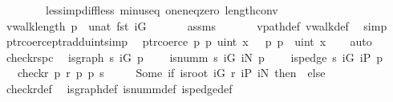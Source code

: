 \begin{isabellebody}
\ \ \ \ \ \ \ \ less{\isacharunderscore}imp{\isacharunderscore}diff{\isacharunderscore}less\ minus{\isacharunderscore}eq\ one{\isacharunderscore}neq{\isacharunderscore}zero\ length{\isacharunderscore}{}{\isacharunderscore}conv{\isacharparenright}\isanewline
\ \ \isamarkupfalse%
\ {\isachardoublequoteopen}vwalk{\isacharunderscore}length\ p\ {\isacharless}\ unat\ {\isacharparenleft}fst\ iG{\isacharparenright}{\isachardoublequoteclose}\isanewline
\ \ \ \ \isamarkupfalse%
\ \ assms\ \isanewline
\ \ \ \ \isamarkupfalse%
\ vpath{\isacharunderscore}def\ vwalk{\isacharunderscore}def\ \isamarkupfalse%
\ simp\isanewline
{}\isamarkupfalse%
%
\endisatagproof
{\isafoldproof}%
%
\isadelimproof
\isanewline
%
\endisadelimproof
\isanewline
{}\isamarkupfalse%
\ ptr{\isacharunderscore}coerce{\isacharunderscore}ptr{\isacharunderscore}add{\isacharunderscore}uint{\isacharbrackleft}simp{\isacharbrackright}{\isacharcolon}\isanewline
\ \ {\isachardoublequoteopen}ptr{\isacharunderscore}coerce\ {\isacharparenleft}p\ {\isacharplus}\isactrlsub p\ uint\ x{\isacharparenright}\ {\isacharequal}\ \ p\ {\isacharplus}\isactrlsub p\ \ {\isacharparenleft}uint\ x{\isacharparenright}{\isachardoublequoteclose}\isanewline
%
\isadelimproof
\ \ %
\endisadelimproof
%
\isatagproof
{}\isamarkupfalse%
\ auto%
\endisatagproof
{\isafoldproof}%
%
\isadelimproof
\isanewline
%
\endisadelimproof
\isanewline
{}\isamarkupfalse%
\ check{\isacharunderscore}r{\isacharprime}{\isacharunderscore}spc{\isacharcolon}\isanewline
\ \ {\isachardoublequoteopen}is{\isacharunderscore}graph\ s\ iG\ p\ {\isasymLongrightarrow}\isanewline
\ \ \ is{\isacharunderscore}numm\ s\ iG\ iN\ p{\isacharprime}\ {\isasymLongrightarrow}\isanewline
\ \ \ is{\isacharunderscore}pedge\ s\ iG\ iP\ p{\isacharprime}{\isacharprime}\ {\isasymLongrightarrow}\isanewline
\ \ \ check{\isacharunderscore}r{\isacharprime}\ p\ r\ p{\isacharprime}{\isacharprime}\ p{\isacharprime}\ s\ {\isacharequal}\ \isanewline
\ \ \ Some\ {\isacharparenleft}if\ is{\isacharunderscore}root\ iG\ r\ iP\ iN\ then\ {}\ else\ {}{\isacharparenright}{\isachardoublequoteclose}\isanewline
%
\isadelimproof
\ \ %
\endisadelimproof
%
\isatagproof
{}\isamarkupfalse%
\ check{\isacharunderscore}r{\isacharprime}{\isacharunderscore}def\ \isamarkupfalse%
\ is{\isacharunderscore}graph{\isacharunderscore}def\ is{\isacharunderscore}numm{\isacharunderscore}def\ is{\isacharunderscore}pedge{\isacharunderscore}def\isanewline

\end{isabellebody}
